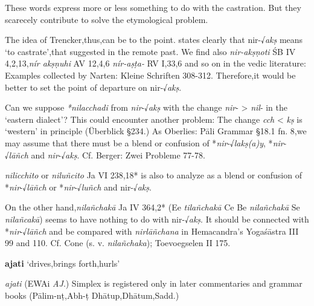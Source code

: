 \documentclass[11pt]{article}
\newcommand*\ṛ{r\symbol{"325}}
\newcommand*\Ṛ{R\symbol{"325}}
\newcommand*\ṝ{r\symbol{"304}\symbol{"325}}
\newcommand*\Ṝ{R\symbol{"304}\symbol{"325}}
\newcommand*\ḷ{l\symbol{"325}}
\newcommand*\ḹ{l\symbol{"304}\symbol{"325}}
\newcommand*\Ḷ{L\symbol{"325}}
\newcommand*\Ḹ{L\symbol{"304}\symbol{"325}}
\begin{document}
These words express more or less something to do with the castration.
But they scarecely contribute to solve the etymological problem.

The idea of Trencker,thus,can be to the point.
\citet[85]{narten:1964} states clearly that nir-√\textit{akṣ} means `to castrate',that \citet[40]{Delbruck:1896} suggested in the remote past.
We find also \textit{nir-akṣṇoti} ŚB IV 4,2,13,\textit{nír akṣṇuhi} AV 12,4,6 \textit{nír-aṣṭa-} RV I,33,6 and so on in the vedic literature:
Examples collected by Narten: Kleine Schriften 308-312.
Therefore,it would be better to set the point of departure on nir-√\textit{akṣ}.

Can we suppose \textit{*nilacchadi} from \textit{nir}-√\textit{akṣ} with the change \textit{nir}- > \textit{nil}- in the `eastern dialect'?
This could encounter another problem: The change \textit{cch} < \textit{kṣ} is `western' in principle (Überblick §234.)
As Oberlies: Pāli Grammar §18.1 fn. 8,we may assume that there must be a blend or confusion of *\textit{nir}-√\textit{lakṣ(a)y}, *\textit{nir}-√\textit{lāñch} and \textit{nir}-√\textit{akṣ}.
Cf. Berger: Zwei Probleme 77-78.

\textit{nilicchito} or \textit{niluñcito} Ja VI 238,18* is also to analyze as a blend or confusion of *\textit{nir}-√\textit{lāñch} or *\textit{nir}-√\textit{luñch} and nir-√\textit{akṣ}.

On the other hand,\textit{nilañchakā} Ja IV 364,2* (Ee \textit{tilañchakā} Ce Be \textit{nilañchakā} Se \textit{nilañcakā}) seems to have nothing to do with nir-√\textit{akṣ}.
It should be connected with *\textit{nir}-√\textit{lāñch} and be compared with \textit{nirlāñchana} in Hemacandra's Yogaśāstra III 99 and 110.
Cf. Cone (s. v. \textit{nilañchaka}); Toevoegselen II 175.

%
%
%
\begin{center}
{\Large
\textbf{ajati } `drives,brings forth,hurls'
}
\end{center}

\begin{description}[leftmargin=\parindent]
\item[ety.] \textit{ajati} (EWAi \textit{AJ}.)
Simplex is registered only in later commentaries and grammar books (Pālim-nṭ,Abh-ṭ Dhātup,Dhātum,Sadd.)
\end{description}
\end{document}
